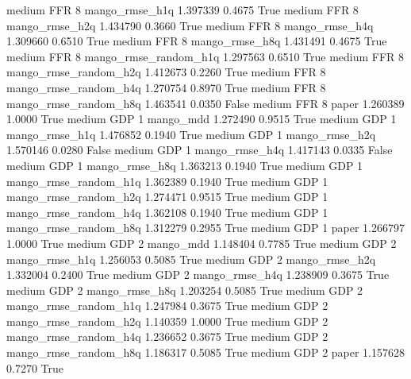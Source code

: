     medium      FFR                 8        mango_rmse_h1q   1.397339      0.4675    True
    medium      FFR                 8        mango_rmse_h2q   1.434790      0.3660    True
    medium      FFR                 8        mango_rmse_h4q   1.309660      0.6510    True
    medium      FFR                 8        mango_rmse_h8q   1.431491      0.4675    True
    medium      FFR                 8 mango_rmse_random_h1q   1.297563      0.6510    True
    medium      FFR                 8 mango_rmse_random_h2q   1.412673      0.2260    True
    medium      FFR                 8 mango_rmse_random_h4q   1.270754      0.8970    True
    medium      FFR                 8 mango_rmse_random_h8q   1.463541      0.0350   False
    medium      FFR                 8                 paper   1.260389      1.0000    True
    medium      GDP                 1             mango_mdd   1.272490      0.9515    True
    medium      GDP                 1        mango_rmse_h1q   1.476852      0.1940    True
    medium      GDP                 1        mango_rmse_h2q   1.570146      0.0280   False
    medium      GDP                 1        mango_rmse_h4q   1.417143      0.0335   False
    medium      GDP                 1        mango_rmse_h8q   1.363213      0.1940    True
    medium      GDP                 1 mango_rmse_random_h1q   1.362389      0.1940    True
    medium      GDP                 1 mango_rmse_random_h2q   1.274471      0.9515    True
    medium      GDP                 1 mango_rmse_random_h4q   1.362108      0.1940    True
    medium      GDP                 1 mango_rmse_random_h8q   1.312279      0.2955    True
    medium      GDP                 1                 paper   1.266797      1.0000    True
    medium      GDP                 2             mango_mdd   1.148404      0.7785    True
    medium      GDP                 2        mango_rmse_h1q   1.256053      0.5085    True
    medium      GDP                 2        mango_rmse_h2q   1.332004      0.2400    True
    medium      GDP                 2        mango_rmse_h4q   1.238909      0.3675    True
    medium      GDP                 2        mango_rmse_h8q   1.203254      0.5085    True
    medium      GDP                 2 mango_rmse_random_h1q   1.247984      0.3675    True
    medium      GDP                 2 mango_rmse_random_h2q   1.140359      1.0000    True
    medium      GDP                 2 mango_rmse_random_h4q   1.236652      0.3675    True
    medium      GDP                 2 mango_rmse_random_h8q   1.186317      0.5085    True
    medium      GDP                 2                 paper   1.157628      0.7270    True
